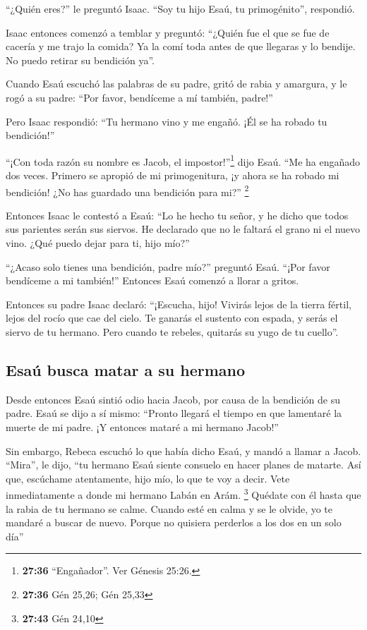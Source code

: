  ``¿Quién eres?'' le preguntó Isaac. ``Soy tu hijo Esaú,
tu primogénito'', respondió.

 Isaac entonces comenzó a temblar y preguntó: ``¿Quién
fue el que se fue de cacería y me trajo la comida? Ya la comí toda antes
de que llegaras y lo bendije. No puedo retirar su bendición ya''.

 Cuando Esaú escuchó las palabras de su padre, gritó de
rabia y amargura, y le rogó a su padre: ``Por favor, bendíceme a mí
también, padre!''

 Pero Isaac respondió: ``Tu hermano vino y me engañó. ¡Él
se ha robado tu bendición!''

 ``¡Con toda razón su nombre es Jacob, el
impostor!''\footnote{\textbf{27:36} ``Engañador''. Ver Génesis 25:26.}
dijo Esaú. ``Me ha engañado dos veces. Primero se apropió de mi
primogenitura, ¡y ahora se ha robado mi bendición! ¿No has guardado una
bendición para mi?'' \footnote{\textbf{27:36} Gén 25,26; Gén 25,33}

 Entonces Isaac le contestó a Esaú: ``Lo he hecho tu
señor, y he dicho que todos sus parientes serán sus siervos. He
declarado que no le faltará el grano ni el nuevo vino. ¿Qué puedo dejar
para ti, hijo mío?''

 ``¿Acaso solo tienes una bendición, padre mío?''
preguntó Esaú. ``¡Por favor bendíceme a mi también!'' Entonces Esaú
comenzó a llorar a gritos.

 Entonces su padre Isaac declaró: ``¡Escucha, hijo!
Vivirás lejos de la tierra fértil, lejos del rocío que cae del cielo.
 Te ganarás el sustento con espada, y serás el siervo de
tu hermano. Pero cuando te rebeles, quitarás su yugo de tu cuello''.

\hypertarget{esauxfa-busca-matar-a-su-hermano}{%
\subsection{Esaú busca matar a su
hermano}\label{esauxfa-busca-matar-a-su-hermano}}

 Desde entonces Esaú sintió odio hacia Jacob, por causa
de la bendición de su padre. Esaú se dijo a sí mismo: ``Pronto llegará
el tiempo en que lamentaré la muerte de mi padre. ¡Y entonces mataré a
mi hermano Jacob!''

 Sin embargo, Rebeca escuchó lo que había dicho Esaú, y
mandó a llamar a Jacob. ``Mira'', le dijo, ``tu hermano Esaú siente
consuelo en hacer planes de matarte.  Así que, escúchame
atentamente, hijo mío, lo que te voy a decir. Vete inmediatamente a
donde mi hermano Labán en Arám. \footnote{\textbf{27:43} Gén 24,10}
 Quédate con él hasta que la rabia de tu hermano se
calme.  Cuando esté en calma y se le olvide, yo te
mandaré a buscar de nuevo. Porque no quisiera perderlos a los dos en un
solo día''

